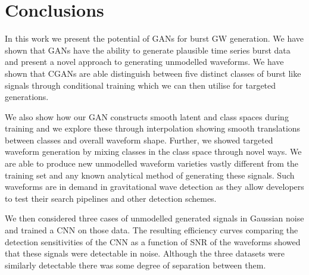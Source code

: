 \documentclass[12pt]{iopart}
\begin{document}

\section{Conclusions}\label{conclusions}

%

In this work we present the potential of \acp{GAN} for
burst \ac{GW} generation. We have shown that \acp{GAN} have the ability to generate plausible time series burst data and present a novel approach to generating unmodelled waveforms. We have shown that CGANs are able distinguish between five distinct classes of burst like signals through conditional training which we can then utilise for targeted generations. 

We also show how our \ac{GAN} constructs smooth latent and class spaces during training and we explore these through interpolation showing smooth translations between classes and overall
waveform shape. Further, we showed targeted waveform generation by mixing classes in the class space through novel ways. We are able to produce new unmodelled waveform varieties vastly different from the training set and any known analytical method of generating these signals. Such waveforms are in demand in gravitational wave detection as they allow developers to test their search pipelines and other detection schemes.

We then considered three cases of unmodelled generated signals in Gaussian noise and trained a \ac{CNN} on those data. The resulting efficiency curves comparing the detection sensitivities of the \ac{CNN} as a function of \ac{SNR} of the waveforms showed that these signals were detectable in noise. Although the three datasets were similarly detectable there was some degree of separation between them.
\end{document}
